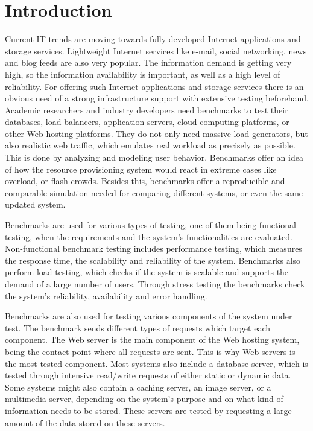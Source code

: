 \chapter{Introduction}
\label{chapter:chapter1}

Current IT trends are moving towards fully developed Internet applications and storage services. Lightweight Internet services like e-mail, social networking, news and blog feeds are also very popular. The information demand is getting very high, so the information availability is important, as well as a high level of reliability. For offering such Internet applications and storage services there is an obvious need of a strong infrastructure support with extensive testing beforehand. Academic researchers and industry developers need benchmarks to test their databases, load balancers, application servers, cloud computing platforms, or other Web hosting platforms. They do not only need massive load generators, but also realistic web traffic, which emulates real workload as precisely as possible. This is done by analyzing and modeling user behavior. Benchmarks offer an idea of how the resource provisioning system would react in extreme cases like overload, or flash crowds. Besides this, benchmarks offer a reproducible and comparable simulation needed for comparing different systems, or even the same updated system.

Benchmarks are used for various types of testing, one of them being functional testing, when the requirements and the system's functionalities are evaluated. Non-functional benchmark testing includes performance testing, which measures the response time, the scalability and reliability of the system. Benchmarks also perform load testing, which checks if the system is scalable and supports the demand of a large number of users. Through stress testing the benchmarks check the system's reliability, availability and error handling.

Benchmarks are also used for testing various components of the system under test. The benchmark sends different types of requests which target each component. The Web server is the main component of the Web hosting system, being the contact point where all requests are sent. This is why Web servers is the most tested component. Most systems also include a database server, which is tested through intensive read/write requests of either static or dynamic data.  Some systems might also contain a caching server, an image server, or a multimedia server, depending on the system's purpose and on what kind of information needs to be stored. These servers are tested by requesting a large amount of the data stored on these servers.

